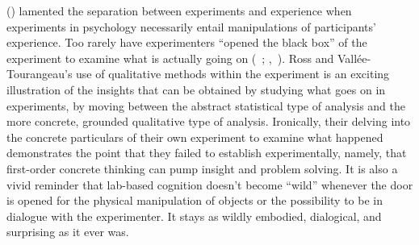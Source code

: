 \documentclass[twocolumn, serif, reflection, authordate]{jote-article}
\begin{document}
 (\citeyear{Moscovici1991}) lamented the separation between experiments and
experience when experiments in psychology necessarily entail
manipulations of participants' experience. Too rarely have experimenters
``opened the black box'' of the experiment to examine what is actually
going on (~\citeyear{Corti2015}; ,~\citeyear{Psaltis2007}). Ross and
Vallée-Tourangeau's use of qualitative methods within the experiment is
an exciting illustration of the insights that can be obtained by
studying what goes on in experiments, by moving between the abstract
statistical type of analysis and the more concrete, grounded qualitative
type of analysis. Ironically, their delving into the concrete
particulars of their own experiment to examine what happened
demonstrates the point that they failed to establish experimentally,
namely, that first-order concrete thinking can pump insight and problem
solving. It is also a vivid reminder that lab-based cognition doesn't
become ``wild'' whenever the door is opened for the physical
manipulation of objects or the possibility to be in dialogue with the
experimenter. It stays as wildly embodied, dialogical, and surprising as
it ever was.


\nocite{*}
\printbibliography
\end{document}
